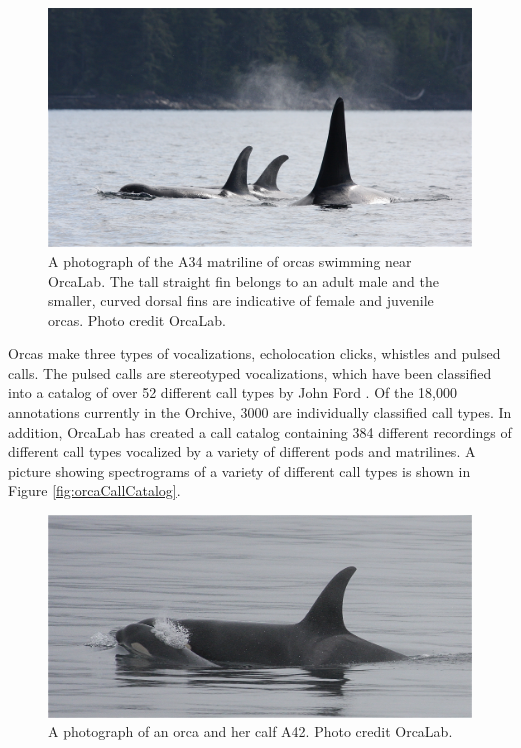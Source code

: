 \begin{figure}[t]
\centering
\includegraphics[width=\columnwidth]{figures/orcasSwimming}
\caption{A photograph of the A34 matriline of orcas swimming near
  OrcaLab.  The tall straight fin belongs to an adult male and the
  smaller, curved dorsal fins are indicative of female and juvenile
  orcas.  Photo credit OrcaLab.}
\label{fig:orcasSwimming}
\end{figure}

Orcas make three types of vocalizations, echolocation clicks, whistles
and pulsed calls.  The pulsed calls are stereotyped vocalizations,
which have been classified into a catalog of over 52 different call
types by John Ford \cite{ford1987catalogue}.  Of the 18,000
annotations currently in the Orchive, 3000 are individually classified
call types.  In addition, OrcaLab has created a call catalog
containing 384 different recordings of different call types vocalized
by a variety of different pods and matrilines.  A picture showing
spectrograms of a variety of different call types is shown in Figure
\ref{fig:orcaCallCatalog}.


\begin{figure}[t]
\centering
\includegraphics[width=\columnwidth]{figures/orcaBaby}
\caption{A photograph of an orca and her calf A42. Photo credit OrcaLab.}
\label{fig:orcaBaby}
\end{figure}

